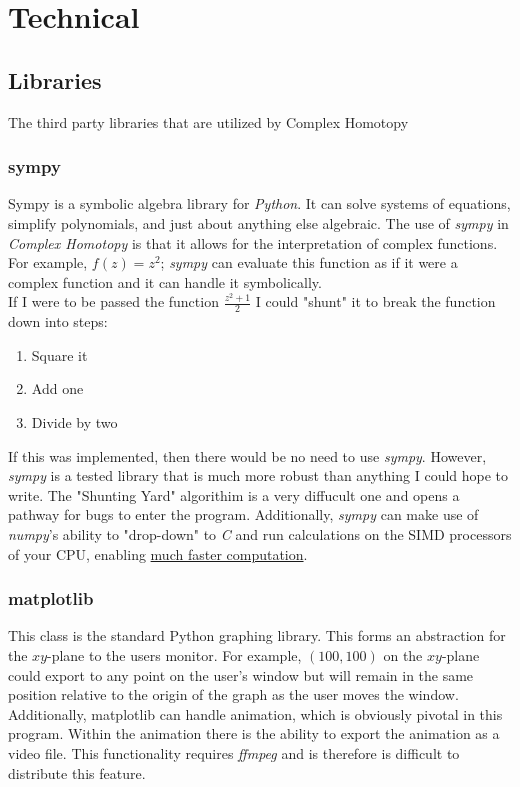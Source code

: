 \documentclass{article}
\begin{document}
\section{Technical}
    \subsection{Libraries}
    The third party libraries that are utilized by Complex Homotopy
        \subsubsection{sympy}
        Sympy is a symbolic algebra library for \textit{Python}. It can solve systems of equations, simplify polynomials, and just about anything else algebraic. The use of \textit{sympy} in \textit{Complex Homotopy} is that it allows for the interpretation of complex functions. For example, $f(z) = z^{2}$; \textit{sympy} can evaluate this function as if it were a complex function and it can handle it symbolically.\\
        If I were to be passed the function $\frac{z^{2} + 1}{2}$ I could "shunt" it to break the function down into steps:
        \begin{enumerate}
            \item Square it
            \item Add one
            \item Divide by two
        \end{enumerate}
        If this was implemented, then there would be no need to use \textit{sympy}. However, \textit{sympy} is a tested library that is much more robust than anything I could hope to write. The "Shunting Yard" algorithim is a very diffucult one and opens a pathway for bugs to enter the program. Additionally, \textit{sympy} can make use of \textit{numpy}'s ability to "drop-down" to \textit{C} and run calculations on the SIMD processors of your CPU, enabling  \href{http://docs.sympy.org/dev/modules/numeric-computation.html}{much faster computation}.
        \subsubsection{matplotlib}
        This class is the standard Python graphing library. This forms an abstraction for the $xy$-plane to the users monitor. For example, $(100,100)$ on the $xy$-plane could export to any point on the user's window but will remain in the same position relative to the origin of the graph as the user moves the window. Additionally, matplotlib can handle animation, which is obviously pivotal in this program. Within the animation there is the ability to export the animation as a video file. This functionality requires \textit{ffmpeg} and is therefore is difficult to distribute this feature.
\end{document}
